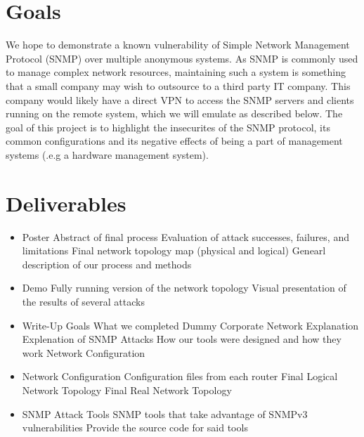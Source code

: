 \documentclass[pdftex, 11pt]{article}
\begin{document}


\pagebreak

\setcounter{secnumdepth}{2}

\section{Goals}
We hope to demonstrate a known vulnerability of Simple Network Management 
Protocol (SNMP) over multiple anonymous systems.  As SNMP is commonly used 
to manage complex network resources, maintaining such a system is something 
that a small company may wish to outsource to a third party IT company.  
This company would likely have a direct VPN to access the SNMP servers and 
clients running on the remote system, which we will emulate as described below. 
The goal of this project is to highlight the insecurites of the SNMP protocol,
its common configurations and its negative effects of being a part of 
management systems (.e.g a hardware management system).

\section{Deliverables}

\begin{itemize}
\item Poster
  \subitem Abstract of final process
  \subitem Evaluation of attack successes, failures, and limitations
  \subitem Final network topology map (physical and logical)
  \subitem Genearl description of our process and methods

\item Demo
  \subitem Fully running version of the network topology %
  \subitem Visual presentation of the results of several attacks

\item Write-Up
  \subitem Goals
  \subitem What we completed
  \subitem Dummy Corporate Network Explanation
  \subitem Explenation of SNMP Attacks
  \subitem How our tools were designed and how they work
  \subitem Network Configuration

\item Network Configuration
  \subitem Configuration files from each router
  \subitem Final Logical Network Topology
  \subitem Final Real Network Topology

\item SNMP Attack Tools
  \subitem SNMP tools that take advantage of SNMPv3  vulnerabilities
  \subitem Provide the source code for said tools

\end{itemize}
\end{document}
